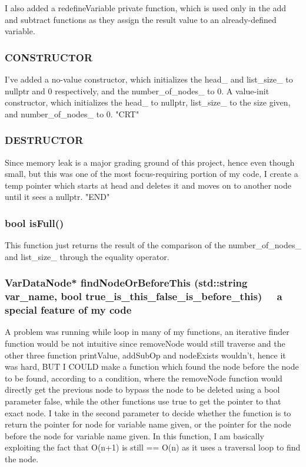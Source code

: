     I also added a redefineVariable private function, which is 
    used only in the add and subtract functions as they assign the result value 
    to an already-defined variable.
    \subsubsection{\color{draculapurple}CONSTRUCTOR}
    I've added a no-value constructor, which initializes the {\color{LimeGreen}head\_} and 
    {\color{LimeGreen}list\_size\_} to nullptr and 0 respectively, and the {\color{LimeGreen}number\_of\_nodes\_} to 0.
    A value-init constructor, which initializes the {\color{LimeGreen}head\_} to nullptr, 
    {\color{LimeGreen}list\_size\_} to the size given, and {\color{LimeGreen}number\_of\_nodes\_} to 0. "CRT"
    \subsubsection{\color{draculapurple}DESTRUCTOR}
    Since memory leak is a major grading ground of this project, 
    hence even though small, but this was one of the most focus-requiring 
    portion of my code, I create a temp pointer which starts at head and deletes 
    it and moves on to another node until it sees a {\color{LightPink}nullptr}. "END"
    \subsubsection{{\color{orange}bool} {\color{draculapurple}isFull}()}
    This function just returns the result of the comparison of the 
    {\color{LimeGreen}number\_of\_nodes\_} and {\color{LimeGreen}list\_size\_} through the equality operator.
    \subsubsection{{\color{orange}VarDataNode*} 
    {\color{draculapurple}findNodeOrBeforeThis}
    ({\color{orange}std::string} var\_name, \newline
    {\color{orange}bool} true\_is\_this\_false\_is\_before\_this)
    \faStar~~{\color{awesome}a special feature of my code}~~\faStar}
    A problem was running while loop in many of my functions, an iterative finder 
    function would be not intuitive since removeNode would still traverse and 
    the other three function {\color{draculapurple}printValue}, {\color{draculapurple}addSubOp} and 
    {\color{draculapurple}nodeExists} wouldn't, hence it was hard, BUT I COULD make a function which found the node before the 
    node to be found, according to a condition, where the removeNode function would 
    directly get the previous node to bypass the node to be deleted using a bool 
    parameter {\color{GoldenYellow}false}, while the other functions use {\color{GoldenYellow}true}
    to get the pointer to that exact node. I take in the second parameter to decide 
    whether the function is to return the pointer for node for variable name given, 
    or the pointer for the node before the node for variable name given.
    In this function, I am basically exploiting the fact that 
    {\color{lightblue}O(n+1) is still == O(n)} as it uses a traversal loop to find the node.
